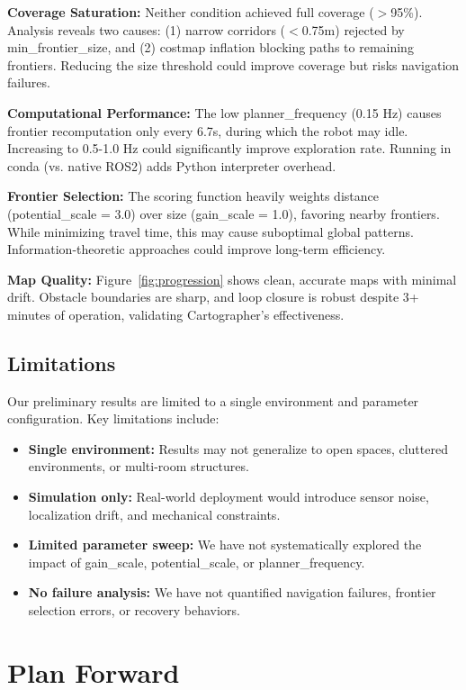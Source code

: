 \documentclass[conference]{IEEEtran}
\begin{document}
\textbf{Coverage Saturation:} Neither condition achieved full coverage ($>$95\%). Analysis reveals two causes: (1) narrow corridors ($<$0.75m) rejected by min\_frontier\_size, and (2) costmap inflation blocking paths to remaining frontiers. Reducing the size threshold could improve coverage but risks navigation failures.

\textbf{Computational Performance:} The low planner\_frequency (0.15 Hz) causes frontier recomputation only every 6.7s, during which the robot may idle. Increasing to 0.5-1.0 Hz could significantly improve exploration rate. Running in conda (vs. native ROS2) adds Python interpreter overhead.

\textbf{Frontier Selection:} The scoring function heavily weights distance (potential\_scale = 3.0) over size (gain\_scale = 1.0), favoring nearby frontiers. While minimizing travel time, this may cause suboptimal global patterns. Information-theoretic approaches could improve long-term efficiency.

\textbf{Map Quality:} Figure~\ref{fig:progression} shows clean, accurate maps with minimal drift. Obstacle boundaries are sharp, and loop closure is robust despite 3+ minutes of operation, validating Cartographer's effectiveness.

\subsection{Limitations}

Our preliminary results are limited to a single environment and parameter configuration. Key limitations include:

\begin{itemize}
    \item \textbf{Single environment:} Results may not generalize to open spaces, cluttered environments, or multi-room structures.
    \item \textbf{Simulation only:} Real-world deployment would introduce sensor noise, localization drift, and mechanical constraints.
    \item \textbf{Limited parameter sweep:} We have not systematically explored the impact of gain\_scale, potential\_scale, or planner\_frequency.
    \item \textbf{No failure analysis:} We have not quantified navigation failures, frontier selection errors, or recovery behaviors.
\end{itemize}

\section{Plan Forward}
\end{document}
